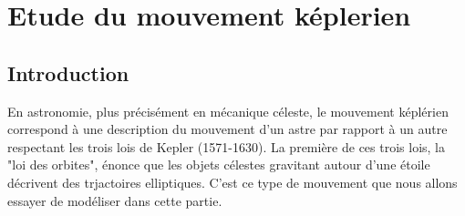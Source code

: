 \documentclass[11pt]{article} %
\begin{document}
\clearpage

\tableofcontents
\clearpage
\section{Etude du mouvement képlerien}
\vspace*{5mm}

\subsection{Introduction}

En astronomie, plus précisément en mécanique céleste, le mouvement képlérien correspond à une description du mouvement d'un astre par rapport à un autre respectant les trois lois de Kepler (1571-1630). La première de ces trois lois, la "loi des orbites", énonce que les objets célestes gravitant autour d'une étoile décrivent des trjactoires elliptiques. C'est ce type de mouvement que nous allons essayer de modéliser dans cette partie.\\
\end{document}
